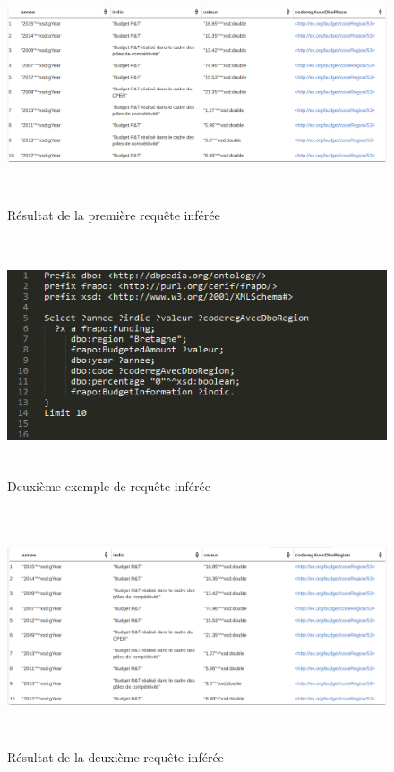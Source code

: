 \documentclass[a4paper,sffamily,12pt]{article}
\begin{document}
		\vspace{1cm}
		
		\begin{figure}[!h]
		
			\centerline{\includegraphics[height=7cm]{picture/result_inference1.png}}
			\caption{Résultat de la première requête inférée}
			\label{res1}
			
		\end{figure}		
	
		\newpage
		
		\begin{figure}[!h]
		
			\vspace{0.5cm}		
			\centerline{\includegraphics[height=7cm]{picture/inference2.png}}
			\caption{Deuxième exemple de requête inférée}
			\label{inf2}
			
		\end{figure}		
	
		\vspace{1cm}
		
		\begin{figure}[!h]
		
			\centerline{\includegraphics[height=7cm]{picture/result_inference2.png}}
			\caption{Résultat de la deuxième requête inférée}
			\label{res2}
			
		\end{figure}		
	
\end{document}
